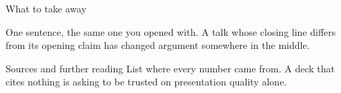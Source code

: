 
\begin{frame}{What to take away}
  \begin{pullquote}
  One sentence, the same one you opened with. A talk whose closing line differs from its
  opening claim has changed argument somewhere in the middle.
  \end{pullquote}
\end{frame}

\begin{frame}{Sources and further reading}
  List where every number came from. A deck that cites nothing is asking to be trusted on
  presentation quality alone.
\end{frame}
